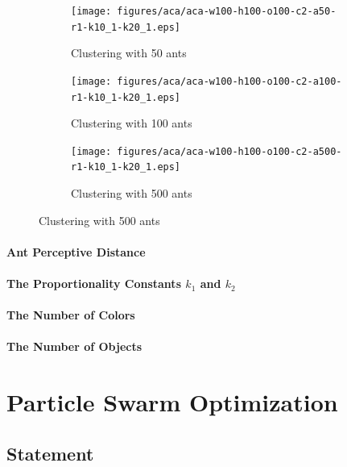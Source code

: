 \documentclass[12pt]{article}
\begin{document}
\begin{figure}[H]
    \begin{subfigure}[b]{0.32\textwidth}
        \centering
        \texttt{[image: figures/aca/aca-w100-h100-o100-c2-a50-r1-k10\_1-k20\_1.eps]}
        \caption{Clustering with 50 ants}\label{fig:aca:num-ants-50}
    \end{subfigure}
    \begin{subfigure}[b]{0.32\textwidth}
        \centering
        \texttt{[image: figures/aca/aca-w100-h100-o100-c2-a100-r1-k10\_1-k20\_1.eps]}
        \caption{Clustering with 100 ants}\label{fig:aca:num-ants-100}
    \end{subfigure}
    \begin{subfigure}[b]{0.32\textwidth}
        \centering
        \texttt{[image: figures/aca/aca-w100-h100-o100-c2-a500-r1-k10\_1-k20\_1.eps]}
        \caption{Clustering with 500 ants}\label{fig:aca:num-ants-200}
    \end{subfigure}
\end{figure}
\paragraph{Ant Perceptive Distance}
\paragraph{The Proportionality Constants $k_1$ and $k_2$}
\paragraph{The Number of Colors}
\paragraph{The Number of Objects}

\section{Particle Swarm Optimization}

\subsection{Statement}
\end{document}
